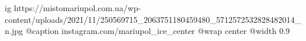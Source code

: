  
 
 
 
 

\ifcmt
  ig https://mistomariupol.com.ua/wp-content/uploads/2021/11/250569715_2063751180459480_5712572532828482014_n.jpg
	@caption instagram.com/mariupol_ice_center
  @wrap center
  @width 0.9
\fi
